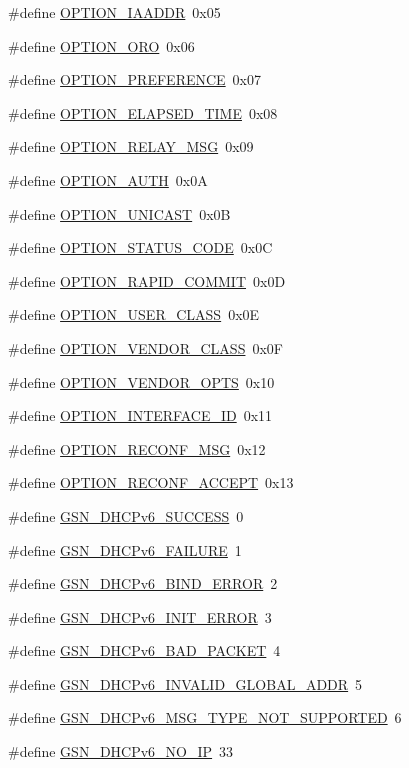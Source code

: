 \begin{DoxyCompactItemize}
\#define \hyperlink{a00483_a957417efd54627f3c3ef58a75ff78bae}{OPTION\_\-IAADDR}~0x05
\item 
\#define \hyperlink{a00483_a628e8c190e5d28f8ac6165ea7611b06b}{OPTION\_\-ORO}~0x06
\item 
\#define \hyperlink{a00483_a6655906f14b043b58a5172ea8b152b2c}{OPTION\_\-PREFERENCE}~0x07
\item 
\#define \hyperlink{a00483_a008afb102f804ed2ccf48979730f78c1}{OPTION\_\-ELAPSED\_\-TIME}~0x08
\item 
\#define \hyperlink{a00483_a8fe8cf1baed9b7ab90125059271a38a6}{OPTION\_\-RELAY\_\-MSG}~0x09
\item 
\#define \hyperlink{a00483_a4565af575648cd808c7056e347c4caae}{OPTION\_\-AUTH}~0x0A
\item 
\#define \hyperlink{a00483_adf64a1d484ee547882ca38c6b17db3c3}{OPTION\_\-UNICAST}~0x0B
\item 
\#define \hyperlink{a00483_a1472aead1468caf555218588d11ec94c}{OPTION\_\-STATUS\_\-CODE}~0x0C
\item 
\#define \hyperlink{a00483_a0581c160f85ebbc711f548fe1687ddfb}{OPTION\_\-RAPID\_\-COMMIT}~0x0D
\item 
\#define \hyperlink{a00483_acd388b3fad92587c49a1ae26a1fea390}{OPTION\_\-USER\_\-CLASS}~0x0E
\item 
\#define \hyperlink{a00483_ab556f01905f90dfb043de286a2e5a67e}{OPTION\_\-VENDOR\_\-CLASS}~0x0F
\item 
\#define \hyperlink{a00483_a9c051d005e37e3e849110ec191ccfe86}{OPTION\_\-VENDOR\_\-OPTS}~0x10
\item 
\#define \hyperlink{a00483_a2974485f1ecc8f0cd4336e1c9a33fbbc}{OPTION\_\-INTERFACE\_\-ID}~0x11
\item 
\#define \hyperlink{a00483_a1c047b46fa235e8f41b3680aa139a4df}{OPTION\_\-RECONF\_\-MSG}~0x12
\item 
\#define \hyperlink{a00483_a69f013e566daff7e6b8ec286a94221c8}{OPTION\_\-RECONF\_\-ACCEPT}~0x13
\item 
\#define \hyperlink{a00483_af16b7d1106c0511b31c46b6c2e28b806}{GSN\_\-DHCPv6\_\-SUCCESS}~0
\item 
\#define \hyperlink{a00483_a0eebeb49f6cb24a60f608ec50ab0ece0}{GSN\_\-DHCPv6\_\-FAILURE}~1
\item 
\#define \hyperlink{a00483_a0ec0b99d472f09654e4863600f4bf23e}{GSN\_\-DHCPv6\_\-BIND\_\-ERROR}~2
\item 
\#define \hyperlink{a00483_a464da6d56a014f1b62a5a90824a1703a}{GSN\_\-DHCPv6\_\-INIT\_\-ERROR}~3
\item 
\#define \hyperlink{a00483_a091a751a7cc6acc2cffebd3a374319e8}{GSN\_\-DHCPv6\_\-BAD\_\-PACKET}~4
\item 
\#define \hyperlink{a00483_ad8ed41acfd9ed0e8a154bee5a02ad21e}{GSN\_\-DHCPv6\_\-INVALID\_\-GLOBAL\_\-ADDR}~5
\item 
\#define \hyperlink{a00483_a404520803dd797f133b20938b0526f90}{GSN\_\-DHCPv6\_\-MSG\_\-TYPE\_\-NOT\_\-SUPPORTED}~6
\item 
\#define \hyperlink{a00483_a5befd9eeb73dd236dc1bd30733150df5}{GSN\_\-DHCPv6\_\-NO\_\-IP}~33
\end{DoxyCompactItemize}

